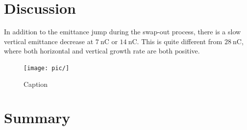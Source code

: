 \documentclass{article}
\begin{document}
\section{Discussion}
In addition to the emittance jump during the swap-out process,
there is a slow vertical emittance decrease at $7~\mathrm{nC}$
or $14~\mathrm{nC}$. This is quite different from 
$28~\mathrm{nC}$, where both horizontal and vertical growth
rate are both positive.

\begin{figure}
    \centering
    \texttt{[image: pic/]}
    \caption{Caption}
    \label{fig:enter-label}
\end{figure}
\section{Summary}



\end{document}

